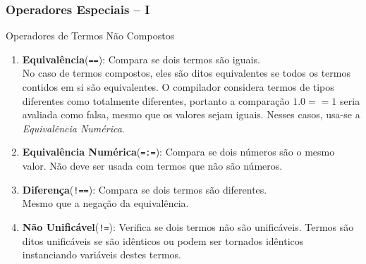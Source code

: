 \begin{frame}[fragile]

    \frametitle{Operadores Especiais -- I}
    
    \begin{block}{Operadores de Termos Não Compostos}

		\begin{enumerate}
    
            \item \textbf{Equivalência}(\verb+==+): Compara se dois termos são iguais.\\No caso de termos
            compostos, eles são ditos equivalentes se todos os termos contidos em si são equivalentes. O 
            compilador considera termos de tipos diferentes como totalmente diferentes, portanto a   comparação 
            $1.0 == 1$ seria avaliada como falsa, mesmo que os valores sejam iguais. Nesses casos, usa-se a 
            \emph{Equivalência Numérica}.

            \item \textbf{Equivalência Numérica}(\verb+=:=+): Compara se dois números são o mesmo valor.
            Não deve ser usada com termos que não são números.

            \item \textbf{Diferença}(\verb+!==+): Compara se dois termos são diferentes.\\Mesmo que a negação da 
            equivalência.

            \item \textbf{Não Unificável}(\verb+!=+): Verifica se dois termos não são unificáveis. Termos são 
            ditos unificáveis se são idênticos ou podem ser tornados idênticos instanciando variáveis destes 
            termos.
    	\end{enumerate}
    \end{block}
    

\end{frame}


